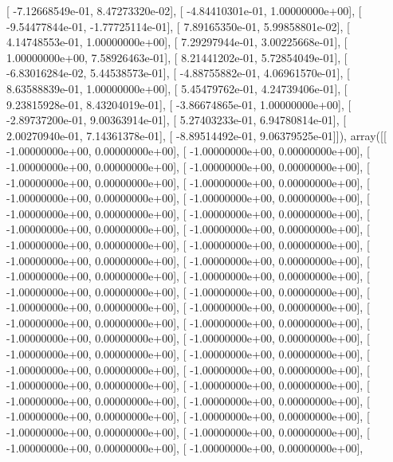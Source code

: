 \documentclass{article}
\begin{document}
       [ -7.12668549e-01,   8.47273320e-02],
       [ -4.84410301e-01,   1.00000000e+00],
       [ -9.54477844e-01,  -1.77725114e-01],
       [  7.89165350e-01,   5.99858801e-02],
       [  4.14748553e-01,   1.00000000e+00],
       [  7.29297944e-01,   3.00225668e-01],
       [  1.00000000e+00,   7.58926463e-01],
       [  8.21441202e-01,   5.72854049e-01],
       [ -6.83016284e-02,   5.44538573e-01],
       [ -4.88755882e-01,   4.06961570e-01],
       [  8.63588839e-01,   1.00000000e+00],
       [  5.45479762e-01,   4.24739406e-01],
       [  9.23815928e-01,   8.43204019e-01],
       [ -3.86674865e-01,   1.00000000e+00],
       [ -2.89737200e-01,   9.00363914e-01],
       [  5.27403233e-01,   6.94780814e-01],
       [  2.00270940e-01,   7.14361378e-01],
       [ -8.89514492e-01,   9.06379525e-01]]), array([[ -1.00000000e+00,   0.00000000e+00],
       [ -1.00000000e+00,   0.00000000e+00],
       [ -1.00000000e+00,   0.00000000e+00],
       [ -1.00000000e+00,   0.00000000e+00],
       [ -1.00000000e+00,   0.00000000e+00],
       [ -1.00000000e+00,   0.00000000e+00],
       [ -1.00000000e+00,   0.00000000e+00],
       [ -1.00000000e+00,   0.00000000e+00],
       [ -1.00000000e+00,   0.00000000e+00],
       [ -1.00000000e+00,   0.00000000e+00],
       [ -1.00000000e+00,   0.00000000e+00],
       [ -1.00000000e+00,   0.00000000e+00],
       [ -1.00000000e+00,   0.00000000e+00],
       [ -1.00000000e+00,   0.00000000e+00],
       [ -1.00000000e+00,   0.00000000e+00],
       [ -1.00000000e+00,   0.00000000e+00],
       [ -1.00000000e+00,   0.00000000e+00],
       [ -1.00000000e+00,   0.00000000e+00],
       [ -1.00000000e+00,   0.00000000e+00],
       [ -1.00000000e+00,   0.00000000e+00],
       [ -1.00000000e+00,   0.00000000e+00],
       [ -1.00000000e+00,   0.00000000e+00],
       [ -1.00000000e+00,   0.00000000e+00],
       [ -1.00000000e+00,   0.00000000e+00],
       [ -1.00000000e+00,   0.00000000e+00],
       [ -1.00000000e+00,   0.00000000e+00],
       [ -1.00000000e+00,   0.00000000e+00],
       [ -1.00000000e+00,   0.00000000e+00],
       [ -1.00000000e+00,   0.00000000e+00],
       [ -1.00000000e+00,   0.00000000e+00],
       [ -1.00000000e+00,   0.00000000e+00],
       [ -1.00000000e+00,   0.00000000e+00],
       [ -1.00000000e+00,   0.00000000e+00],
       [ -1.00000000e+00,   0.00000000e+00],
       [ -1.00000000e+00,   0.00000000e+00],
       [ -1.00000000e+00,   0.00000000e+00],
       [ -1.00000000e+00,   0.00000000e+00],
       [ -1.00000000e+00,   0.00000000e+00],
       [ -1.00000000e+00,   0.00000000e+00],
       [ -1.00000000e+00,   0.00000000e+00],
\end{document}
